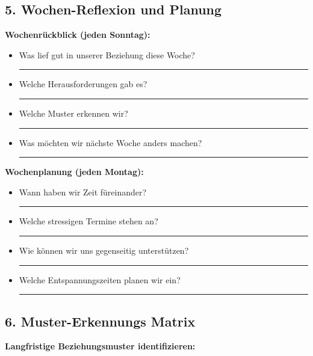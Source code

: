 {\hypertarget{wochen-reflexion-und-planung}{%
\subsection{5. Wochen-Reflexion und Planung}}\label{wochen-reflexion-und-planung}

\textbf{Wochenrückblick (jeden Sonntag):}

\begin{itemize}
\tightlist
\item
  Was lief gut in unserer Beziehung diese Woche? \rule{8cm}{0.4pt}
\item
  Welche Herausforderungen gab es? \rule{8cm}{0.4pt}
\item
  Welche Muster erkennen wir? \rule{8cm}{0.4pt}
\item
  Was möchten wir nächste Woche anders machen? \rule{8cm}{0.4pt}
\end{itemize}

\textbf{Wochenplanung (jeden Montag):}

\begin{itemize}
\tightlist
\item
  Wann haben wir Zeit füreinander? \rule{8cm}{0.4pt}
\item
  Welche stressigen Termine stehen an? \rule{8cm}{0.4pt}
\item
  Wie können wir uns gegenseitig unterstützen? \rule{8cm}{0.4pt}
\item
  Welche Entspannungszeiten planen wir ein? \rule{8cm}{0.4pt}
\end{itemize}

\hypertarget{muster-erkennungs-matrix}{%
\subsection{6. Muster-Erkennungs Matrix}}\label{muster-erkennungs-matrix}

\textbf{Langfristige Beziehungsmuster identifizieren:}

}
